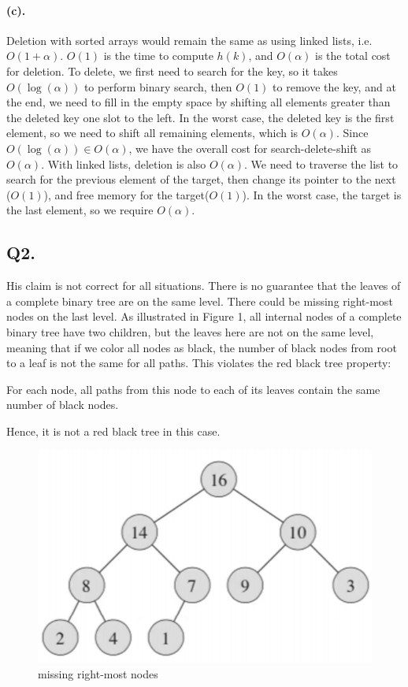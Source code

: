 \documentclass[12pt]{article}
\begin{document}
\paragraph{(c).} Deletion with sorted arrays would remain the same as using linked lists, i.e. \(O(1 +\alpha)\). \(O(1)\) is the time to compute \(h(k)\), and \(O(\alpha)\) is the total cost for deletion. To delete, we first need to search for the key, so it takes \(O(\log(\alpha))\) to perform binary search, then \(O(1)\) to remove the key, and at the end, we need to fill in the empty space by shifting all elements greater than the deleted key one slot to the left. In the worst case, the deleted key is the first element, so we need to shift all remaining elements, which is \(O(\alpha)\). Since \(O(\log(\alpha)) \in O(\alpha)\), we have the overall cost for search-delete-shift as \(O(\alpha)\). With linked lists, deletion is also \(O(\alpha)\). We need to traverse the list to search for the previous element of the target, then change its pointer to the next (\(O(1)\)), and free memory for the target(\(O(1)\)). In the worst case, the target is the last element, so we require \(O(\alpha)\).

\subsection*{Q2.}
His claim is not correct for all situations. There is no guarantee that the leaves of a complete binary tree are on the same level. There could be missing right-most nodes on the last level. As illustrated in Figure 1, all internal nodes of a complete binary tree have two children, but the leaves here are not on the same level, meaning that if we color all nodes as black, the number of black nodes from root to a leaf is not the same for all paths. This violates the red black tree property:
\begin{displayquote}[][]
     For each node, all paths from this node to each of its leaves contain the same number of black nodes.
\end{displayquote}
Hence, it is not a red black tree in this case.
\begin{figure}[H]
     \centering
     \includegraphics[scale =0.8]{q2a.png} 
     \caption{missing right-most nodes}
\end{figure}
\end{document}
